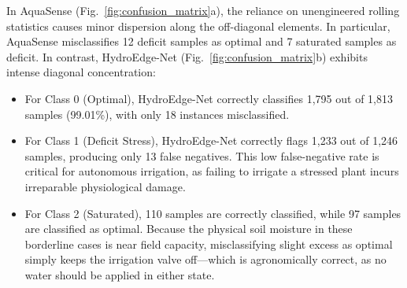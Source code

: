 In AquaSense (Fig.~\ref{fig:confusion_matrix}a), the reliance on unengineered rolling statistics causes minor dispersion along the off-diagonal elements. In particular, AquaSense misclassifies 12 deficit samples as optimal and 7 saturated samples as deficit. In contrast, HydroEdge-Net (Fig.~\ref{fig:confusion_matrix}b) exhibits intense diagonal concentration:
\begin{itemize}
    \item For Class 0 (Optimal), HydroEdge-Net correctly classifies 1,795 out of 1,813 samples (99.01\%), with only 18 instances misclassified.
    \item For Class 1 (Deficit Stress), HydroEdge-Net correctly flags 1,233 out of 1,246 samples, producing only 13 false negatives. This low false-negative rate is critical for autonomous irrigation, as failing to irrigate a stressed plant incurs irreparable physiological damage.
    \item For Class 2 (Saturated), 110 samples are correctly classified, while 97 samples are classified as optimal. Because the physical soil moisture in these borderline cases is near field capacity, misclassifying slight excess as optimal simply keeps the irrigation valve off---which is agronomically correct, as no water should be applied in either state.
\end{itemize}
